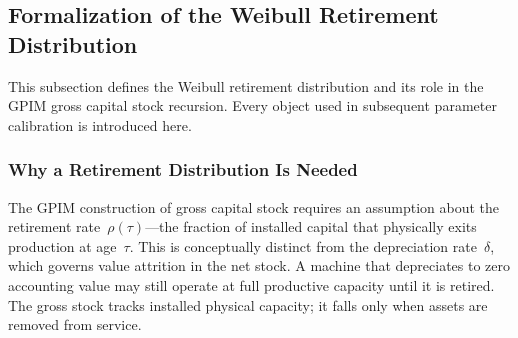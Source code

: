 
\subsection{Formalization of the Weibull Retirement Distribution}
\label{app:ret:formalization}

This subsection defines the Weibull retirement distribution and its role in the
GPIM gross capital stock recursion. Every object used in subsequent parameter
calibration is introduced here.

\subsubsection{Why a Retirement Distribution Is Needed}
\label{app:ret:why}

The GPIM construction of gross capital stock requires an assumption about the
retirement rate~$\rho(\tau)$---the fraction of installed capital that physically
exits production at age~$\tau$. This is conceptually distinct from the
depreciation rate~$\delta$, which governs value attrition in the net stock. A
machine that depreciates to zero accounting value may still operate at full
productive capacity until it is retired. The gross stock tracks installed
physical capacity; it falls only when assets are removed from service.


